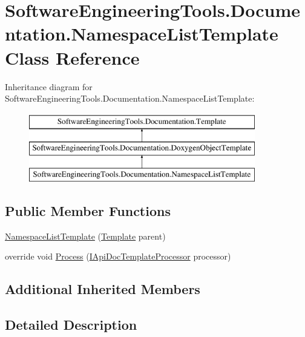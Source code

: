 \hypertarget{class_software_engineering_tools_1_1_documentation_1_1_namespace_list_template}{\section{Software\+Engineering\+Tools.\+Documentation.\+Namespace\+List\+Template Class Reference}
\label{class_software_engineering_tools_1_1_documentation_1_1_namespace_list_template}
}
Inheritance diagram for Software\+Engineering\+Tools.\+Documentation.\+Namespace\+List\+Template\+:\begin{figure}[H]
\begin{center}
\leavevmode
\includegraphics[height=3.000000cm]{class_software_engineering_tools_1_1_documentation_1_1_namespace_list_template}
\end{center}
\end{figure}
\subsection*{Public Member Functions}
\begin{DoxyCompactItemize}
\item 
\hyperlink{class_software_engineering_tools_1_1_documentation_1_1_namespace_list_template_a118cc0139f5e8829ed190e3d6cce2581}{Namespace\+List\+Template} (\hyperlink{class_software_engineering_tools_1_1_documentation_1_1_template}{Template} parent)
\item 
override void \hyperlink{class_software_engineering_tools_1_1_documentation_1_1_namespace_list_template_a814da49180e02ea143f0337f7a69ff1f}{Process} (\hyperlink{interface_software_engineering_tools_1_1_documentation_1_1_i_api_doc_template_processor}{I\+Api\+Doc\+Template\+Processor} processor)
\end{DoxyCompactItemize}
\subsection*{Additional Inherited Members}


\subsection{Detailed Description}


